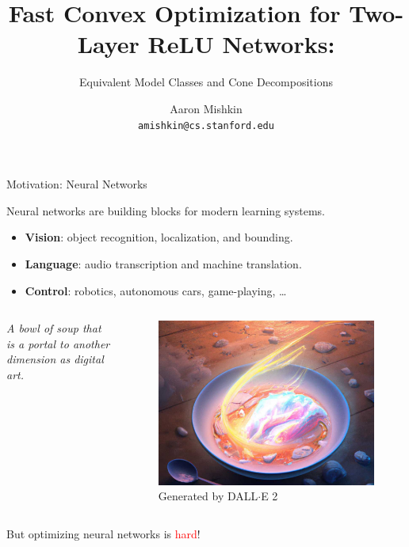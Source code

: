 \documentclass[usenames,dvipsnames,mathserif,notheorems]{beamer}
\title{Fast Convex Optimization for Two-Layer ReLU Networks:}
\subtitle{Equivalent Model Classes and Cone Decompositions}
\author{Aaron Mishkin \\ \texttt{amishkin@cs.stanford.edu}}
\date{}
\begin{document}
\maketitle

\begin{frame}{Motivation: Neural Networks}

	Neural networks are building blocks for modern learning systems.
	\vspace{0.5em}
	\begin{itemize}
		\item \textbf{Vision}: object recognition, localization, and bounding.
		\item \textbf{Language}: audio transcription and machine translation.
		\item \textbf{Control}: robotics, autonomous cars, game-playing, \ldots
	\end{itemize}

	\vspace{0.5em}

	\begin{columns}
		\begin{column}{0.6\textwidth}
			\centering
			\textit{A bowl of soup that is a portal to another
				dimension as digital art.}
		\end{column}
		\begin{column}{0.45\textwidth}
			\begin{figure}[]
				\centering
				\includegraphics[width=0.8\linewidth]{assets/bowl_of_soup.jpg}
				\caption*{Generated by DALL$\cdot$E 2}%
			\end{figure}
		\end{column}
	\end{columns}

	\vspace{0.5em}

	\begin{center}
		\Large
		But optimizing neural networks is \textcolor{red}{hard}!
	\end{center}


\end{frame}
\end{document}
